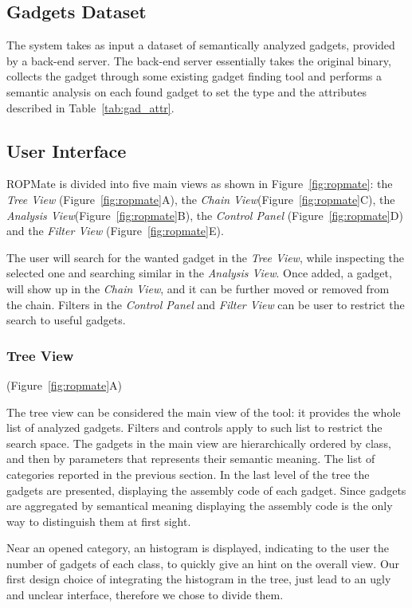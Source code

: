 \documentclass[twocolumn, 11pt]{article}
\begin{document}
\subsection{Gadgets Dataset} The system takes as input a dataset of semantically analyzed gadgets, provided by a back-end server. The back-end server essentially takes the original binary, collects the gadget through some existing gadget finding tool and performs a semantic analysis on each found gadget to set the type and the attributes described in Table~\ref{tab:gad_attr}.

\subsection{User Interface}
ROPMate is divided into five main views as shown in Figure~\ref{fig:ropmate}: the \textit{Tree View} (Figure~\ref{fig:ropmate}A), the \textit{Chain View}(Figure~\ref{fig:ropmate}C), the \textit{Analysis View}(Figure~\ref{fig:ropmate}B), the \textit{Control Panel} (Figure~\ref{fig:ropmate}D) and the \textit{Filter View} (Figure~\ref{fig:ropmate}E).

The user will search for the wanted gadget in the \textit{Tree View}, while inspecting the selected one and searching similar in the \textit{Analysis View}. Once added, a gadget, will show up in the \textit{Chain View}, and it can be further moved or removed from the chain. Filters in the \textit{Control Panel} and \textit{Filter View} can be user to restrict the search to useful gadgets.

\subsubsection{Tree View}
(Figure~\ref{fig:ropmate}A)

The tree view can be considered the main view of the tool: it provides the whole list of analyzed gadgets. Filters and controls apply to such list to restrict the search space. The gadgets in the main view are hierarchically ordered by class, and then by parameters that represents their semantic meaning. The list of categories reported in the previous section. In the last level of the tree the gadgets are presented, displaying the assembly code of each gadget. Since gadgets are aggregated by semantical meaning displaying the assembly code is the only way to distinguish them at first sight.

Near an opened category, an histogram is displayed, indicating to the user the number of gadgets of each class, to quickly give an hint on the overall view. Our first design choice of integrating the histogram in the tree, just lead to an ugly and unclear interface, therefore we chose to divide them.
\end{document}
